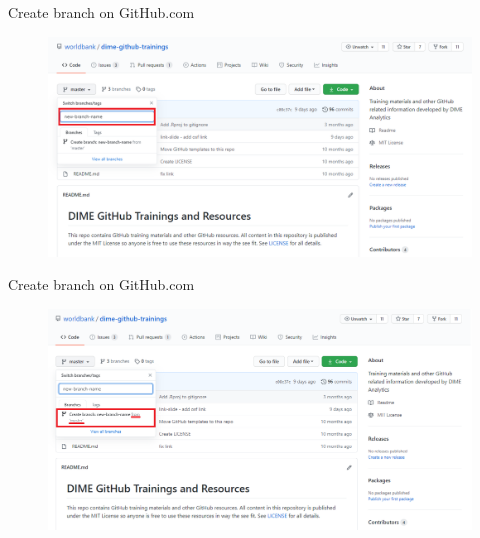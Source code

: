 \documentclass[aspectratio=169]{beamer} %
\begin{document}
\begin{frame}{Create branch on GitHub.com}
\begin{figure}
	\centering
	\includegraphics[width=.9\textwidth]{./img/new-branch-2.png}
\end{figure}
\end{frame}

\begin{frame}{Create branch on GitHub.com}
\begin{figure}
	\centering
	\includegraphics[width=.9\textwidth]{./img/new-branch-3.png}
\end{figure}
\hyperlink{Create a branch}{}
\end{frame}
\end{document}
